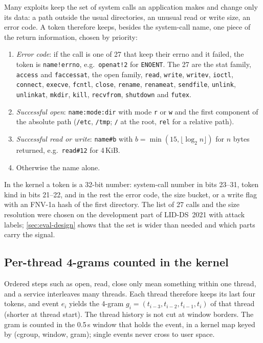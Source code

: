 Many exploits keep the set of system calls an application makes and change only its data: a path outside the usual
directories, an unusual read or write size, an error code. A token therefore keeps, besides the system-call name, one
piece of the return information, chosen by priority:
\begin{enumerate}
\item \emph{Error code}: if the call is one of 27 that keep their errno and it failed, the token is
  \texttt{name!errno}, e.g.\ \texttt{openat!2} for \texttt{ENOENT}. The 27 are the stat family, \texttt{access} and
  \texttt{faccessat}, the open family, \texttt{read}, \texttt{write}, \texttt{writev}, \texttt{ioctl},
  \texttt{connect}, \texttt{execve}, \texttt{fcntl}, \texttt{close}, \texttt{rename}, \texttt{renameat},
  \texttt{sendfile}, \texttt{unlink}, \texttt{unlinkat}, \texttt{mkdir}, \texttt{kill}, \texttt{recvfrom},
  \texttt{shutdown} and \texttt{futex}.
\item \emph{Successful open}: \texttt{name:mode:dir} with mode \texttt{r} or \texttt{w} and the first component of the
  absolute path (\texttt{/etc}, \texttt{/tmp}; \texttt{/} at the root, \texttt{rel} for a relative path).
\item \emph{Successful read or write}: \texttt{name\#b} with $b=\min(15,\lfloor\log_2 n\rfloor)$ for $n$ bytes
  returned, e.g.\ \texttt{read\#12} for 4\,KiB.
\item Otherwise the name alone.
\end{enumerate}
In the kernel a token is a 32-bit number: system-call number in bits 23--31, token kind in bits 21--22, and in the rest
the error code, the size bucket, or a write flag with an FNV-1a hash of the first directory. The list of 27 calls and
the size resolution were chosen on the development part of LID-DS~2021 with attack labels; \cref{sec:eval-design}
shows that the set is wider than needed and which parts carry the signal.

\subsection{Per-thread 4-grams counted in the kernel}

Ordered steps such as open, read, close only mean something within one thread, and a service interleaves many threads.
Each thread therefore keeps its last four tokens, and event $e_i$ yields the 4-gram $g_i=(t_{i-3},t_{i-2},t_{i-1},t_i)$
of that thread (shorter at thread start). The thread history is not cut at window borders. The gram is counted in the
0.5\,s window that holds the event, in a kernel map keyed by (cgroup, window, gram); single events never cross to user
space.

